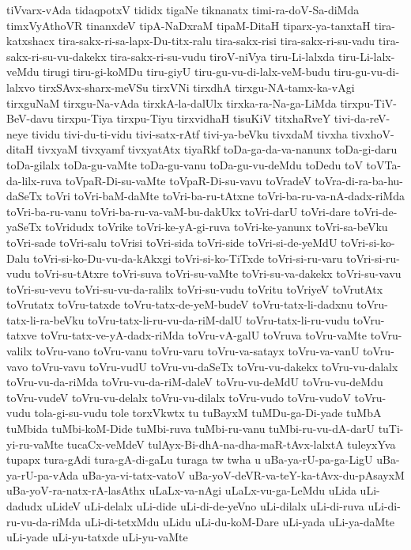 {tiVvarx-vAda
tidaqpotxV
tididx
tigaNe
tiknanatx
timi-ra-doV-Sa-diMda
timxVyAthoVR
tinanxdeV
tipA-NaDxraM
tipaM-DitaH
tiparx-ya-tanxtaH
tira-katxshacx
tira-sakx-ri-sa-lapx-Du-titx-ralu
tira-sakx-risi
tira-sakx-ri-su-vadu
tira-sakx-ri-su-vu-dakekx
tira-sakx-ri-su-vudu
tiroV-niVya
tiru-Li-lalxda
tiru-Li-lalx-veMdu
tirugi
tiru-gi-koMDu
tiru-giyU
tiru-gu-vu-di-lalx-veM-budu
tiru-gu-vu-di-lalxvo
tirxSAvx-sharx-meVSu
tirxVNi
tirxdhA
tirxgu-NA-tamx-ka-vAgi
tirxguNaM
tirxgu-Na-vAda
tirxkA-la-dalUlx
tirxka-ra-Na-ga-LiMda
tirxpu-TiV-BeV-davu
tirxpu-Tiya
tirxpu-Tiyu
tirxvidhaH
tisuKiV
titxhaRveY
tivi-da-reV-neye
tividu
tivi-du-ti-vidu
tivi-satx-rAtf
tivi-ya-beVku
tivxdaM
tivxha
tivxhoV-ditaH
tivxyaM
tivxyamf
tivxyatAtx
tiyaRkf
toDa-ga-da-va-nanunx
toDa-gi-daru
toDa-gilalx
toDa-gu-vaMte
toDa-gu-vanu
toDa-gu-vu-deMdu
toDedu
toV
toVTa-da-lilx-ruva
toVpaR-Di-su-vaMte
toVpaR-Di-su-vavu
toVradeV
toVra-di-ra-ba-hu-daSeTx
toVri
toVri-baM-daMte
toVri-ba-ru-tAtxne
toVri-ba-ru-va-nA-dadx-riMda
toVri-ba-ru-vanu
toVri-ba-ru-va-vaM-bu-dakUkx
toVri-darU
toVri-dare
toVri-de-yaSeTx
toVridudx
toVrike
toVri-ke-yA-gi-ruva
toVri-ke-yanunx
toVri-sa-beVku
toVri-sade
toVri-salu
toVrisi
toVri-sida
toVri-side
toVri-si-de-yeMdU
toVri-si-ko-Dalu
toVri-si-ko-Du-vu-da-kAkxgi
toVri-si-ko-TiTxde
toVri-si-ru-varu
toVri-si-ru-vudu
toVri-su-tAtxre
toVri-suva
toVri-su-vaMte
toVri-su-va-dakekx
toVri-su-vavu
toVri-su-vevu
toVri-su-vu-da-ralilx
toVri-su-vudu
toVritu
toVriyeV
toVrutAtx
toVrutatx
toVru-tatxde
toVru-tatx-de-yeM-budeV
toVru-tatx-li-dadxnu
toVru-tatx-li-ra-beVku
toVru-tatx-li-ru-vu-da-riM-dalU
toVru-tatx-li-ru-vudu
toVru-tatxve
toVru-tatx-ve-yA-dadx-riMda
toVru-vA-galU
toVruva
toVru-vaMte
toVru-valilx
toVru-vano
toVru-vanu
toVru-varu
toVru-va-satayx
toVru-va-vanU
toVru-vavo
toVru-vavu
toVru-vudU
toVru-vu-daSeTx
toVru-vu-dakekx
toVru-vu-dalalx
toVru-vu-da-riMda
toVru-vu-da-riM-daleV
toVru-vu-deMdU
toVru-vu-deMdu
toVru-vudeV
toVru-vu-delalx
toVru-vu-dilalx
toVru-vudo
toVru-vudoV
toVru-vudu
tola-gi-su-vudu
tole
torxVkwtx
tu
tuBayxM
tuMDu-ga-Di-yade
tuMbA
tuMbida
tuMbi-koM-Dide
tuMbi-ruva
tuMbi-ru-vanu
tuMbi-ru-vu-dA-darU
tuTi-yi-ru-vaMte
tucaCx-veMdeV
tulAyx-Bi-dhA-na-dha-maR-tAvx-lalxtA
tuleyxYva
tupapx
tura-gAdi
tura-gA-di-gaLu
turaga
tw
twha
u
uBa-ya-rU-pa-ga-LigU
uBa-ya-rU-pa-vAda
uBa-ya-vi-tatx-vatoV
uBa-yoV-deVR-va-teY-ka-tAvx-du-pAsayxM
uBa-yoV-ra-natx-rA-lasAthx
uLaLx-va-nAgi
uLaLx-vu-ga-LeMdu
uLida
uLi-dadudx
uLideV
uLi-delalx
uLi-dide
uLi-di-de-yeVno
uLi-dilalx
uLi-di-ruva
uLi-di-ru-vu-da-riMda
uLi-di-tetxMdu
uLidu
uLi-du-koM-Dare
uLi-yada
uLi-ya-daMte
uLi-yade
uLi-yu-tatxde
uLi-yu-vaMte
}
